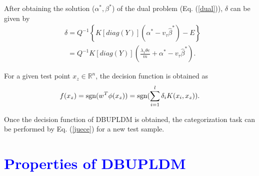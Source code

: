 \documentclass[a4paper]{cas-sc}
\begin{document}
After obtaining the solution ($\alpha^{*}, \beta^{*}$) of the dual problem (Eq. (\ref{dual})), $\delta$ can be given by
\begin{equation}
\label{delta}
\begin{aligned}
&\delta  = {Q^{ - 1}}\left\{ {K[diag(Y)](\alpha^{*}  - v_{\tau}\hat{\beta}^{*}) - E} \right\}\\
& \ \ = {Q^{ - 1}}K[diag(Y)](\frac{\lambda_{1}\mathbb{\theta}e}{m}+\alpha^{*}-v_{\tau}\hat{\beta}^{*}).
\end{aligned}
\end{equation}

For a given test point $x_z \in \mathbb{R}^{n}$, the decision function is obtained as
\begin{equation}
\label{juece}
f(x_z) = {\mathop{\rm sgn}} ({w ^T}\phi ({x_z})) = {\mathop{\rm sgn}}(\sum\limits_{i = 1}^l {{\delta _i}K({x_i},x_z)} ).
\end{equation}

Once the decision function of DBUPLDM is obtained, the categorization task can be performed by Eq. (\ref{juece}) for a new test sample.



\renewcommand{\thesection}{\color{blue}\arabic{section}}
\section{\textcolor{blue}{Properties of DBUPLDM \label{4}}}%
\renewcommand{\thesection}{\arabic{section}}
\end{document}
